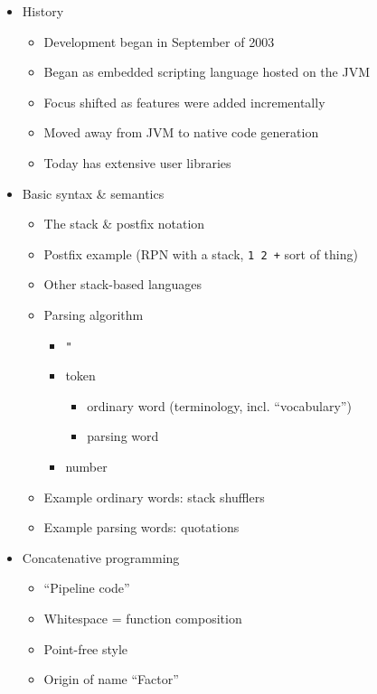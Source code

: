 \documentclass[11pt]{article}
\begin{document}
\begin{itemize}

\item History
      \begin{itemize}
        \item Development began in September of 2003
        \item Began as embedded scripting language hosted on the JVM
        \item Focus shifted as features were added incrementally
        \item Moved away from JVM to native code generation
        \item Today has extensive user libraries
      \end{itemize}

\item Basic syntax \& semantics
      \begin{itemize}
        \item The stack \& postfix notation
        \item Postfix example (RPN with a stack, \verb|1 2 +| sort of thing)
        \item Other stack-based languages
        \item Parsing algorithm
              \begin{itemize}
                \item \verb|"|
                \item token
                      \begin{itemize}
                        \item ordinary word (terminology, incl. ``vocabulary'')
                        \item parsing word
                      \end{itemize}
                \item number
              \end{itemize}
        \item Example ordinary words: stack shufflers
        \item Example parsing words: quotations
      \end{itemize}

\item Concatenative programming
      \begin{itemize}
        \item ``Pipeline code''
        \item Whitespace = function composition
        \item Point-free style
        \item Origin of name ``Factor''
      \end{itemize}


\end{itemize}
\end{document}

